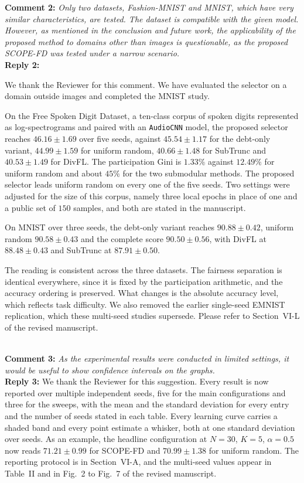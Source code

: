 \documentclass[10pt]{article}
\begin{document}
\noindent
\textbf{Comment 2:} \textit{Only two datasets, Fashion-MNIST and MNIST, which have very similar characteristics, are tested. The dataset is compatible with the given model. However, as mentioned in the conclusion and future work, the applicability of the proposed method to domains other than images is questionable, as the proposed SCOPE-FD was tested under a narrow scenario.} \\
\noindent
\textbf{Reply 2:} {We thank the Reviewer for this comment. We have evaluated the selector on a domain outside images and completed the MNIST study.

On the Free Spoken Digit Dataset, a ten-class corpus of spoken digits represented as log-spectrograms and paired with an \texttt{AudioCNN} model, the proposed selector reaches $46.16 \pm 1.69$ over five seeds, against $45.54 \pm 1.17$ for the debt-only variant, $44.99 \pm 1.59$ for uniform random, $40.66 \pm 1.48$ for SubTrunc and $40.53 \pm 1.49$ for DivFL. The participation Gini is $1.33\%$ against $12.49\%$ for uniform random and about $45\%$ for the two submodular methods. The proposed selector leads uniform random on every one of the five seeds. Two settings were adjusted for the size of this corpus, namely three local epochs in place of one and a public set of $150$ samples, and both are stated in the manuscript.

On MNIST over three seeds, the debt-only variant reaches $90.88 \pm 0.42$, uniform random $90.58 \pm 0.43$ and the complete score $90.50 \pm 0.56$, with DivFL at $88.48 \pm 0.43$ and SubTrunc at $87.91 \pm 0.50$.

The reading is consistent across the three datasets. The fairness separation is identical everywhere, since it is fixed by the participation arithmetic, and the accuracy ordering is preserved. What changes is the absolute accuracy level, which reflects task difficulty. We also removed the earlier single-seed EMNIST replication, which these multi-seed studies supersede. Please refer to Section~VI-L of the revised manuscript.}\\

\noindent
\textbf{Comment 3:} \textit{As the experimental results were conducted in limited settings, it would be useful to show confidence intervals on the graphs.} \\
\noindent
\textbf{Reply 3:} {We thank the Reviewer for this suggestion. Every result is now reported over multiple independent seeds, five for the main configurations and three for the sweeps, with the mean and the standard deviation for every entry and the number of seeds stated in each table. Every learning curve carries a shaded band and every point estimate a whisker, both at one standard deviation over seeds. As an example, the headline configuration at $N=30$, $K=5$, $\alpha=0.5$ now reads $71.21 \pm 0.99$ for SCOPE-FD and $70.99 \pm 1.38$ for uniform random. The reporting protocol is in Section~VI-A, and the multi-seed values appear in Table~II and in Fig.~2 to Fig.~7 of the revised manuscript.}\\
\end{document}
